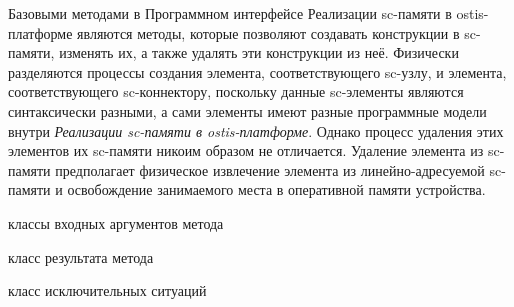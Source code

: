 Базовыми методами в {Программном интерфейсе Реализации sc-памяти в ostis-платформе} являются методы, которые позволяют создавать конструкции в sc-памяти, изменять их, а также удалять эти конструкции из неё. Физически разделяются процессы создания элемента, соответствующего sc-узлу, и элемента, соответствующего sc-коннектору, поскольку данные sc-элементы являются синтаксически разными, а сами элементы имеют разные программные модели внутри \textit{Реализации sc-памяти в ostis-платформе}. Однако процесс удаления этих элементов их sc-памяти никоим образом не отличается. Удаление элемента из sc-памяти предполагает физическое извлечение элемента из линейно-адресуемой sc-памяти и освобождение занимаемого места в оперативной памяти устройства.

\begin{SCn}
\begin{scnsubstruct}
	
\begin{scnsubstruct}

\begin{scnindent}
\end{scnindent}
\begin{scnrelfromvector}{классы входных аргументов метода}
\end{scnrelfromvector}
\begin{scnrelfromlist}{класс результата метода}
\end{scnrelfromlist}
\begin{scnrelfromlist}{класс исключительных ситуаций}
\end{scnrelfromlist}


\end{scnsubstruct}
\end{scnsubstruct}
\end{SCn}
